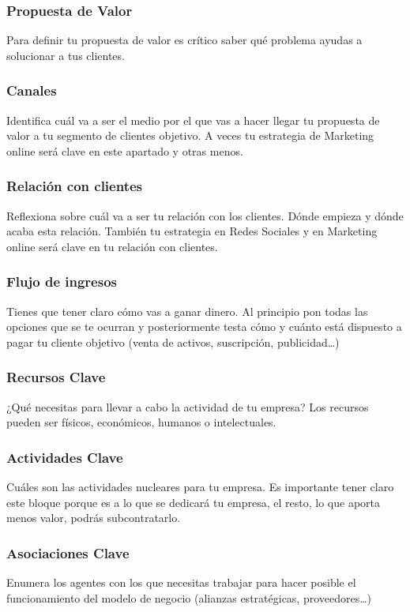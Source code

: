 \documentclass[10pt,a4paper]{article}
\begin{document}
				\subsubsection{Propuesta de Valor}				
				Para definir tu propuesta de valor es crítico saber qué problema ayudas a solucionar a tus clientes. 
				
				\subsubsection{Canales}				
				Identifica cuál va a ser el medio por el que vas a hacer llegar tu propuesta de valor a tu segmento de clientes objetivo. A veces tu estrategia de Marketing online será clave en este apartado y otras menos. 
				
				\subsubsection{Relación con clientes}
				Reflexiona sobre cuál va a ser tu relación con los clientes. Dónde empieza y dónde acaba esta relación. También tu estrategia en Redes Sociales y en Marketing online será clave en tu relación con clientes. 
				
				\subsubsection{Flujo de ingresos}
				Tienes que tener claro cómo vas a ganar dinero. Al principio pon todas las opciones que se te ocurran y posteriormente testa cómo y cuánto está dispuesto a pagar tu cliente objetivo (venta de activos, suscripción, publicidad…)
				
				\subsubsection{Recursos Clave}
				¿Qué necesitas para llevar a cabo la actividad de tu empresa? Los recursos pueden ser físicos, económicos, humanos o intelectuales. 
				
				\subsubsection{Actividades Clave}
				Cuáles son las actividades nucleares para tu empresa. Es importante tener claro este bloque porque es a lo que se dedicará tu empresa, el resto, lo que aporta menos valor, podrás subcontratarlo. 
				
				\subsubsection{Asociaciones Clave}
				Enumera los agentes con los que necesitas trabajar para hacer posible el funcionamiento del modelo de negocio (alianzas estratégicas, proveedores…) 
\end{document}
